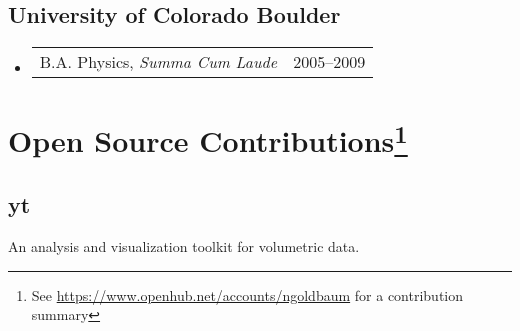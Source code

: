 \documentclass[10pt,letterpaper]{article}
\newcommand{\textline}[2]{
  \begin{tabularx}{\textwidth}{XY}
  #1 & #2
  \end{tabularx}
}
\begin{document}
\subsection*{University of Colorado Boulder}
\begin{itemize}
  \item[] \textline{B.A. Physics, \textit{Summa Cum Laude}}{2005--2009}
\end{itemize}


\section*{Open Source Contributions\footnote{See
    \href{https://www.openhub.net/accounts/ngoldbaum}{https://www.openhub.net/accounts/ngoldbaum}
    for a contribution summary}}

\subsection*{yt}
An analysis and visualization toolkit for volumetric data.
\end{document}
